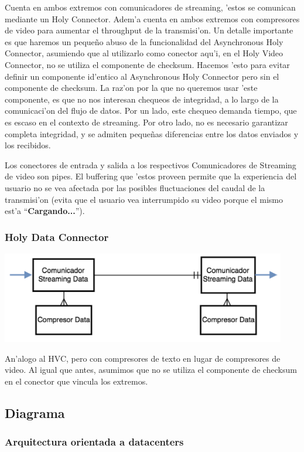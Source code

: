 Cuenta en ambos extremos con comunicadores de streaming, 'estos se comunican mediante un Holy Connector. Adem'a cuenta en ambos extremos con compresores de video para aumentar el throughput de la transmisi'on.
Un detalle importante es que haremos un peque\~no abuso de la funcionalidad del Asynchronous Holy Connector, asumiendo que al utilizarlo como conector aqu'i, en el Holy Video Connector, no se utiliza el componente de checksum. Hacemos 'esto para evitar definir un componente id'entico al Asynchronous Holy Connector pero sin el componente de checksum. La raz'on por la que no queremos usar 'este componente, es que no nos interesan chequeos de integridad, a lo largo de la comunicaci'on del flujo de datos. Por un lado, este chequeo demanda tiempo, que es escaso en el contexto de streaming. Por otro lado, no es necesario garantizar completa integridad, y se admiten peque\~nas diferencias entre los datos enviados y los recibidos.

Los conectores de entrada y salida a los respectivos Comunicadores de Streaming de video son pipes. El buffering que 'estos proveen permite que la experiencia del usuario no se vea afectada por las posibles fluctuaciones del caudal de la transmisi'on (evita que el usuario vea interrumpido su video porque el mismo est'a ``\textbf{Cargando...}'').

\subsubsection{Holy Data Connector}

\includegraphics[height=4cm]{diagramas/HDC} 

An'alogo al HVC, pero con compresores de texto en lugar de compresores de video. Al igual que antes, asumimos que no se utiliza el componente de checksum en el conector que vincula los extremos.

\subsection{Diagrama}

\subsubsection{Arquitectura orientada a datacenters}

